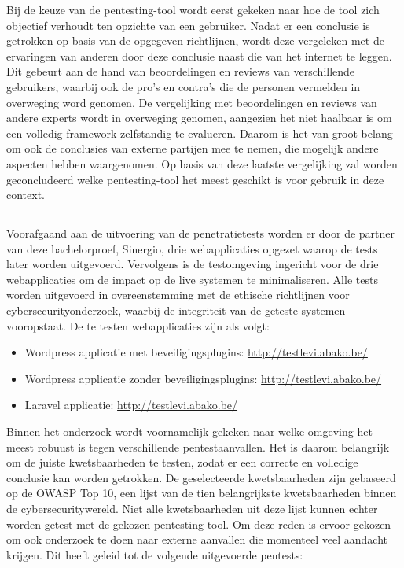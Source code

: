 Bij de keuze van de pentesting-tool wordt eerst gekeken naar hoe de tool zich objectief verhoudt ten opzichte van een 
gebruiker. Nadat er een conclusie is getrokken op basis van de opgegeven richtlijnen, wordt deze vergeleken met de ervaringen 
van anderen door deze conclusie naast die van het internet te leggen. Dit gebeurt aan de hand van beoordelingen en reviews van 
verschillende gebruikers, waarbij ook de pro's en contra's die de personen vermelden in overweging word genomen. De vergelijking 
met beoordelingen en reviews van andere experts wordt in overweging genomen, aangezien het niet haalbaar is om een volledig framework 
zelfstandig te evalueren. Daarom is het van groot belang om ook de conclusies van externe partijen mee te nemen, die mogelijk andere 
aspecten hebben waargenomen. Op basis van 
deze laatste vergelijking zal worden geconcludeerd welke pentesting-tool het meest geschikt is voor gebruik in deze context.

\subsection{}
Voorafgaand aan de uitvoering van de penetratietests worden er door de partner van deze bachelorproef, Sinergio, drie 
webapplicaties opgezet waarop de tests later worden uitgevoerd. Vervolgens is de testomgeving ingericht voor de drie 
webapplicaties om de impact op de live systemen te minimaliseren. Alle tests worden uitgevoerd in overeenstemming met de ethische 
richtlijnen voor cybersecurityonderzoek, waarbij de integriteit van de geteste systemen vooropstaat. De te testen 
webapplicaties zijn als volgt:

\begin{itemize}
    \item Wordpress applicatie met beveiligingsplugins: \url{http://testlevi.abako.be/}
    \item Wordpress applicatie zonder beveiligingsplugins: \url{http://testlevi.abako.be/}
    \item Laravel applicatie: \url{http://testlevi.abako.be/}
\end{itemize}

Binnen het onderzoek wordt voornamelijk gekeken naar welke omgeving het meest robuust is tegen verschillende pentestaanvallen. 
Het is daarom belangrijk om de juiste kwetsbaarheden te testen, zodat er een correcte en volledige conclusie kan worden 
getrokken. De geselecteerde kwetsbaarheden zijn gebaseerd op de OWASP Top 10, een lijst van de tien belangrijkste 
kwetsbaarheden binnen de cybersecuritywereld. Niet alle kwetsbaarheden uit deze lijst kunnen echter worden getest met de 
gekozen pentesting-tool. Om deze reden is ervoor gekozen om ook onderzoek te doen naar externe aanvallen die momenteel veel 
aandacht krijgen. Dit heeft geleid tot de volgende uitgevoerde pentests:

